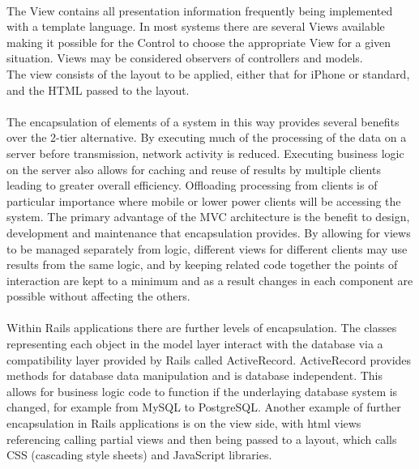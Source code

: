 \documentclass[letterpaper]{amsart}
\begin{document}
\paragraph{ }The View contains all presentation information frequently being implemented with a template language. In most systems there are several Views available making it possible for the Control to choose the appropriate View for a given situation. Views may be considered observers of controllers and models.\\The view consists of the layout to be applied, either that for iPhone or standard, and the HTML passed to the layout.
\paragraph{ }
The encapsulation of elements of a system in this way provides several benefits over the 2-tier alternative.  By executing much of the processing of the data on a server before transmission, network activity is reduced.  Executing business logic on the server also allows for caching and reuse of results by multiple clients leading to greater overall efficiency.  Offloading processing from clients is of particular importance where mobile or lower power clients will be accessing the system.  The primary advantage of the MVC architecture is the benefit to design, development and maintenance that encapsulation provides.  By allowing for views to be managed separately from logic, different views for different clients may use results from the same logic, and by keeping related code together the points of interaction are kept to a minimum and as a result changes in each component are possible without affecting the others.\cite{unobajax}
\paragraph{ }  Within Rails applications there are further levels of encapsulation.  The classes representing each object in the model layer interact with the database via a compatibility layer provided by Rails called ActiveRecord.  ActiveRecord provides methods for database data manipulation and is database independent.  This allows for business logic code to function if the underlaying database system is changed, for example from MySQL to PostgreSQL.  Another example of further encapsulation in Rails applications is on the view side, with html views referencing calling partial views and then being passed to a layout, which calls CSS (cascading style sheets) and JavaScript libraries.
\end{document}
